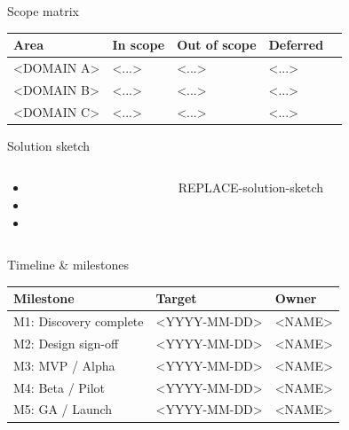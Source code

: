 \documentclass[aspectratio=169,12pt]{beamer}
\begin{document}
\begin{frame}{Scope matrix}
  \begin{tabular}{lllll}
    \toprule
    Area & In scope & Out of scope & Deferred \\
    \midrule
    <DOMAIN A> & <...> & <...> & <...> \\
    <DOMAIN B> & <...> & <...> & <...> \\
    <DOMAIN C> & <...> & <...> & <...> \\
    \bottomrule
  \end{tabular}
\end{frame}

\begin{frame}{Solution sketch}
  \begin{columns}[T]
    \begin{column}{0.55\textwidth}
      \begin{itemize}
        \item <Approach in one sentence>
        \item <Key decision 1>
        \item <Key decision 2>
      \end{itemize}
    \end{column}
    \begin{column}{0.4\textwidth}
      \fbox{\rule{0pt}{4.5cm}\rule{\textwidth}{0pt}}
      \begin{center}\footnotesize REPLACE-solution-sketch\end{center}
    \end{column}
  \end{columns}
\end{frame}

\begin{frame}{Timeline \& milestones}
  \begin{tabular}{lll}
    \toprule
    Milestone & Target & Owner \\
    \midrule
    M1: Discovery complete & <YYYY-MM-DD> & <NAME> \\
    M2: Design sign-off & <YYYY-MM-DD> & <NAME> \\
    M3: MVP / Alpha & <YYYY-MM-DD> & <NAME> \\
    M4: Beta / Pilot & <YYYY-MM-DD> & <NAME> \\
    M5: GA / Launch & <YYYY-MM-DD> & <NAME> \\
    \bottomrule
  \end{tabular}
\end{frame}
\end{document}
